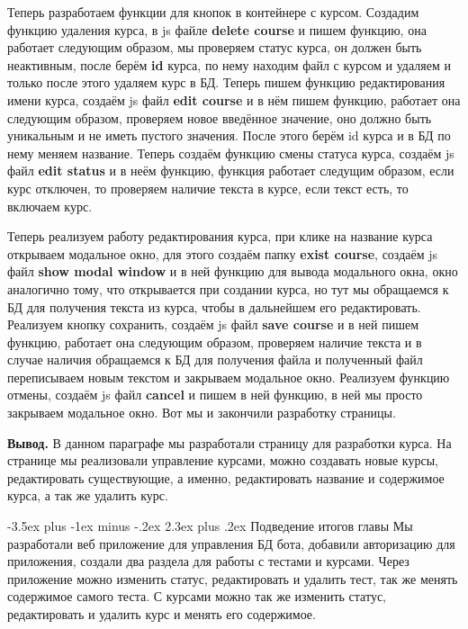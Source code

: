 \documentclass[12pt, oldlfont, amsfonts]{report}
\makeatletter
\renewcommand{\section}{\@startsection{section}{1}{0pt}%
                                {-3.5ex plus -1ex minus -.2ex}%
                                {2.3ex plus .2ex}%
{\centering\hyphenpenalty=10000\normalfont\Large\bfseries}}
\makeatother
\begin{document}
Теперь разработаем функции для кнопок в контейнере с курсом. Создадим функцию удаления курса, в js файле {\bf delete course} и пишем функцию, она работает следующим образом, мы проверяем статус курса, он должен быть неактивным, после берём {\bf id} курса, по нему находим файл с курсом и удаляем и только после этого удаляем курс в БД. Теперь пишем функцию редактирования имени курса, создаём js файл {\bf edit course} и в нём пишем функцию, работает она следующим образом, проверяем новое введённое значение, оно должно быть уникальным и не иметь пустого значения. После этого берём id курса и в БД по нему меняем название. Теперь создаём функцию смены статуса курса, создаём js файл {\bf edit status} и в неём функцию, функция работает следущим образом, если курс отключен, то проверяем наличие текста в курсе, если текст есть, то включаем курс.

Теперь реализуем работу редактирования курса, при клике на название курса открываем модальное окно, для этого создаём папку {\bf exist course}, создаём js файл {\bf show modal window} и в ней функцию для вывода модального окна, окно аналогично тому, что открывается при создании курса, но тут мы обращаемся к БД для получения текста из курса, чтобы в дальнейшем его редактировать. Реализуем кнопку сохранить, создаём js файл {\bf save course} и в ней пишем функцию, работает она следующим образом, проверяем наличие текста и в случае наличия обращаемся к БД для получения файла и полученный файл переписываем новым текстом и закрываем модальное окно. Реализуем функцию отмены, создаём js файл {\bf cancel} и пишем в ней функцию, в ней мы просто закрываем модальное окно. Вот мы и закончили разработку страницы.

{\bf Вывод.} В данном параграфе мы разработали страницу для разработки курса. На странице мы реализовали управление курсами, можно создавать новые курсы, редактировать существующие, а именно, редактировать название и содержимое курса, а так же удалить курс.

\section{Подведение итогов главы}
Мы разработали веб приложение для управления БД бота, добавили авторизацию для приложения, создали два раздела для работы с тестами и курсами. Через приложение можно изменить статус, редактировать и удалить тест, так же менять содержимое самого теста. С курсами можно так же изменить статус, редактировать и удалить курс и менять его содержимое.
\end{document}
